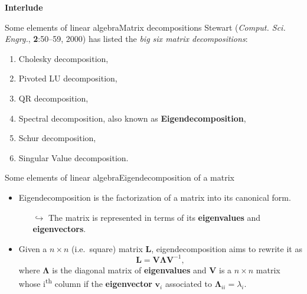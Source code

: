 \documentclass[usenames,dvipsnames,svgnames,10pt,aspectratio=169]{beamer}
\begin{document}
\begin{frame}[t, c]{}
	\centering
	\vspace{1cm}

	{\Large \textbf{Interlude}}

	\bigskip

	{}

\end{frame}

\begin{frame}[t, c]{Some elements of linear algebra}{Matrix decompositions}
	Stewart (\emph{Comput. Sci. Engrg.}, \textbf{2}:50--59, 2000) has listed the \emph{big six matrix decompositions}:


	\begin{enumerate}
		\item Cholesky decomposition,
		\item Pivoted LU decomposition,
		\item QR decomposition,
		\item Spectral decomposition, also known as \alert{\textbf{Eigendecomposition}},
		\item Schur decomposition,
		\item Singular Value decomposition.
	\end{enumerate}

	\vspace{1cm}
\end{frame}

\begin{frame}[t, c]{Some elements of linear algebra}{Eigendecomposition of a matrix}
	\begin{itemize}
		\item Eigendecomposition is the factorization of a matrix into its canonical form.
		\begin{itemize}
			\item[$\hookrightarrow$] The matrix is represented in terms of its \alert{\textbf{eigenvalues}} and \alert{\textbf{eigenvectors}}.
		\end{itemize}

		\bigskip

		\item Given a $n \times n$ (i.e.\ square) matrix ${\bm L}$, eigendecomposition aims to rewrite it as
		$${\bm L} = {\bm V} {\boldsymbol \Lambda}{\bm V}^{-1},$$
		where ${\boldsymbol \Lambda}$ is the diagonal matrix of \alert{\textbf{eigenvalues}} and ${\bm V}$ is a $n \times n$ matrix whose i\textsuperscript{th} column if the \alert{\textbf{eigenvector}} ${\bm v}_i$ associated to ${\boldsymbol \Lambda}_{ii} = \lambda_i$.
	\end{itemize}

	\vspace{1cm}
\end{frame}
\end{document}

